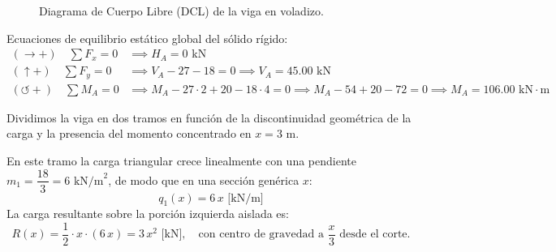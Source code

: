 \begin{figure}[H]
{%
    }
    \caption{Diagrama de Cuerpo Libre (DCL) de la viga en voladizo.}
    \label{fig:ejemplo6_dcl}
\end{figure}

Ecuaciones de equilibrio estático global del sólido rígido:
\begin{align}
    (\rightarrow +) \quad \sum F_x = 0      & \implies \boxed{H_A = 0\text{ kN}}                                                                                                   \\[4pt]
    (\uparrow +) \quad \sum F_y = 0         & \implies V_A - 27 - 18 = 0 \implies \boxed{V_A = 45.00\text{ kN}}                                                                    \\[4pt]
    (\circlearrowleft +) \quad \sum M_A = 0 & \implies M_A - 27 \cdot 2 + 20 - 18 \cdot 4 = 0 \implies M_A - 54 + 20 - 72 = 0 \implies \boxed{M_A = 106.00\text{ kN}\cdot\text{m}}
\end{align}


Dividimos la viga en dos tramos en función de la discontinuidad geométrica de la carga y la presencia del momento concentrado en $x = 3\text{ m}$.


En este tramo la carga triangular crece linealmente con una pendiente $m_1 = \dfrac{18}{3} = 6\text{ kN/m}^2$, de modo que en una sección genérica $x$:
\begin{equation}
    q_1(x) = 6\,x\text{ [kN/m]}
\end{equation}
La carga resultante sobre la porción izquierda aislada es:
\begin{equation}
    R(x) = \frac{1}{2} \cdot x \cdot (6\,x) = 3\,x^2\text{ [kN]}, \quad \text{con centro de gravedad a } \frac{x}{3} \text{ desde el corte.}
\end{equation}

